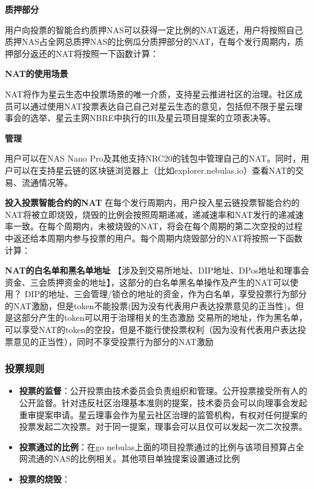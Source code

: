 \begin{enumerate}
\textbf{质押部分}

用户向投票的智能合约质押NAS可以获得一定比例的NAT返还，用户将按照自己质押NAS占全网总质押NAS的比例瓜分质押部分的NAT，在每个发行周期内，质押部分返还的NAT将按照一下函数计算：

\textbf{NAT的使用场景}

NAT将作为星云生态中投票场景的唯一介质，支持星云推进社区的治理。社区成员可以通过使用NAT投票表达自己自己对星云生态的意见，包括但不限于星云理事会的选举、星云主网NBRE中执行的IR及星云项目提案的立项表决等。

\textbf{管理}

用户可以在NAS Nano Pro及其他支持NRC20的钱包中管理自己的NAT。同时，用户可以在支持星云链的区块链浏览器上（比如explorer.nebulas.io）查看NAT的交易、流通情况等。

\textbf{投入投票智能合约的NAT}
在每个发行周期内，用户投入星云链投票智能合约的NAT将被立即烧毁，烧毁的比例会按照周期递减，递减速率和NAT发行的递减速率一致。在每个周期内，未被烧毁的NAT，将会在每个周期的第二次空投的过程中返还给本周期内参与投票的用户。每个周期内烧毁部分的NAT将按照一下函数计算：

\textbf{NAT的白名单和黑名单地址}
【涉及到交易所地址、DIP地址、DPos地址和理事会资金、三会质押资金的地址】，这部分的白名单黑名单操作及产生的NAT可以使用？
DIP的地址、三会管理/锁仓的地址的资金，作为白名单，享受投票行为部分的NAT激励，但是token不能投票(因为没有代表用户表达投票意见的正当性)，但是这部分产生的token可以用于治理相关的生态激励
交易所的地址，作为黑名单，可以享受NAT的token的空投，但是不能行使投票权利（因为没有代表用户表达投票意见的正当性），同时不享受投票行为部分的NAT激励

\subsubsection{投票规则}

\begin{itemize}
	\item \textbf{投票的监督}：公开投票由技术委员会负责组织和管理。公开投票接受所有人的公开监督。针对违反社区治理基本准则的提案，技术委员会可以向理事会发起重审提案申请。星云理事会作为星云社区治理的监管机构，有权对任何提案的投票发起二次投票。对于同一提案，理事会可以且仅可以发起一次二次投票。
	\item \textbf{投票通过的比例}：在go nebulas上面的项目投票通过的比例与该项目预算占全网流通的NAS的比例相关。其他项目单独提案设置通过比例
	\item \textbf{投票的烧毁}：
	

\end{itemize}
\end{enumerate}
